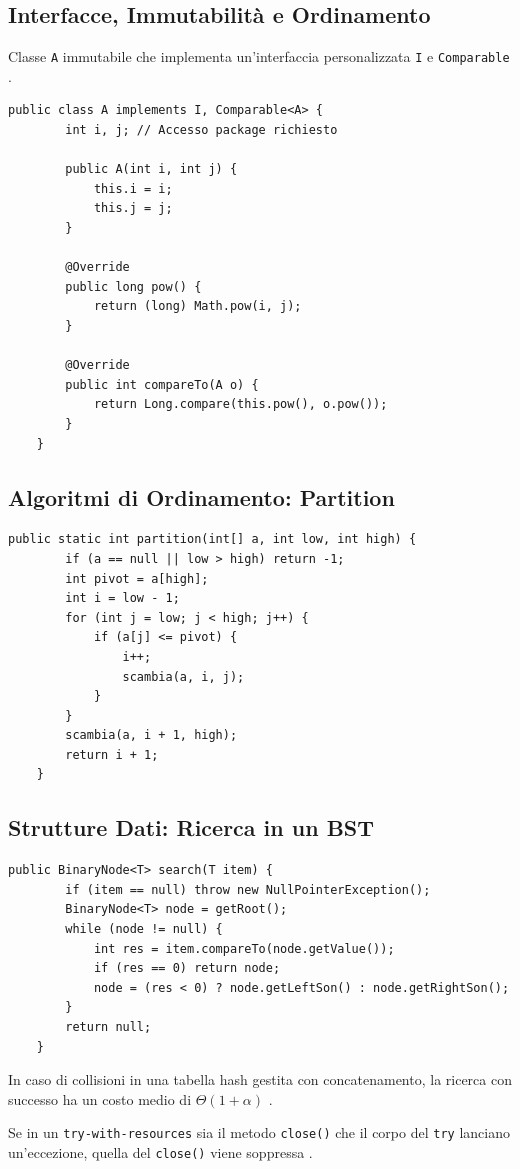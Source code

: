 \subsection{Interfacce, Immutabilità e Ordinamento}
\begin{esempio}
	Classe \texttt{A} immutabile che implementa un'interfaccia personalizzata \texttt{I} e \texttt{Comparable} \cite{234, 177}.
\end{esempio}

\begin{lstlisting}[caption={Classe A con ordinamento basato su pow()}]
	public class A implements I, Comparable<A> {
		int i, j; // Accesso package richiesto
		
		public A(int i, int j) {
			this.i = i;
			this.j = j;
		}
		
		@Override
		public long pow() {
			return (long) Math.pow(i, j);
		}
		
		@Override
		public int compareTo(A o) {
			return Long.compare(this.pow(), o.pow());
		}
	}
\end{lstlisting}

\newpage
\subsection{Algoritmi di Ordinamento: Partition}
\begin{lstlisting}[caption={Procedura Partition classica}]
	public static int partition(int[] a, int low, int high) {
		if (a == null || low > high) return -1;
		int pivot = a[high];
		int i = low - 1;
		for (int j = low; j < high; j++) {
			if (a[j] <= pivot) {
				i++;
				scambia(a, i, j);
			}
		}
		scambia(a, i + 1, high);
		return i + 1;
	}
\end{lstlisting}

\subsection{Strutture Dati: Ricerca in un BST}
\begin{lstlisting}[caption={Metodo search in BinarySearchTree}]
	public BinaryNode<T> search(T item) {
		if (item == null) throw new NullPointerException();
		BinaryNode<T> node = getRoot();
		while (node != null) {
			int res = item.compareTo(node.getValue());
			if (res == 0) return node;
			node = (res < 0) ? node.getLeftSon() : node.getRightSon();
		}
		return null;
	}
\end{lstlisting}

\begin{nota}
	In caso di collisioni in una tabella hash gestita con concatenamento, la ricerca con successo ha un costo medio di $\Theta(1+\alpha)$ \cite{8, 31}.
\end{nota}

\begin{hardnote}
	Se in un \texttt{try-with-resources} sia il metodo \texttt{close()} che il corpo del \texttt{try} lanciano un'eccezione, quella del \texttt{close()} viene soppressa \cite{35, 58}.
\end{hardnote}